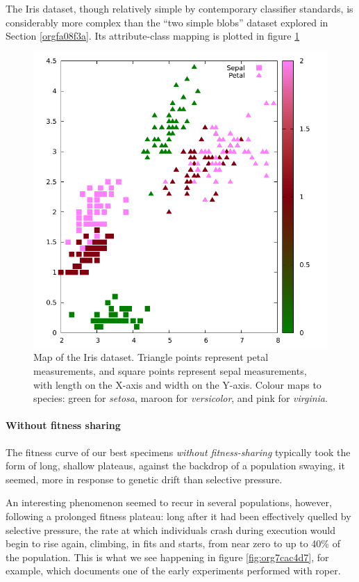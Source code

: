 \documentclass[12pt,glossary]{dalthesis}
\begin{document}
The Iris dataset, though relatively simple by contemporary classifier standards, 
is considerably more complex than the ``two simple blobs'' dataset explored in
Section \ref{orgfa08f3a}. Its attribute-class mapping is plotted
in figure \ref{fig:org0e2df9e}

\begin{figure}[htbp]
\centering
\includegraphics[width=.9\linewidth]{../images/plots/iris_plot.pdf}
\caption{\label{fig:org0e2df9e}
Map of the Iris dataset. Triangle points represent petal measurements, and square points represent sepal measurements, with length on the X-axis and width on the Y-axis. Colour maps to species: green for \emph{setosa}, maroon for \emph{versicolor}, and pink for \emph{virginia}.}
\end{figure}


\paragraph{Without fitness sharing}
\label{sec:orgcf4471c}

The fitness curve of our best specimens \emph{without fitness-sharing} typically took
the form of long, shallow plateaus, against the backdrop of a population swaying,
it seemed, more in response to genetic drift than selective pressure.

An interesting phenomenon seemed to recur in several populations, however, following
a prolonged fitness plateau: long after it had been effectively quelled by selective
pressure, the rate at which individuals crash during execution would begin to rise
again, climbing, in fits and starts, from near zero to up to 40\% of the population.
This is what we see happening in figure \ref{fig:org7cac4d7}, for example,
which documents one of the early experiments performed with \gls{roper}.
\end{document}
